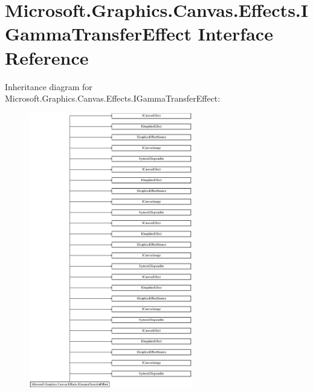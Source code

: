 \hypertarget{interface_microsoft_1_1_graphics_1_1_canvas_1_1_effects_1_1_i_gamma_transfer_effect}{}\section{Microsoft.\+Graphics.\+Canvas.\+Effects.\+I\+Gamma\+Transfer\+Effect Interface Reference}
\label{interface_microsoft_1_1_graphics_1_1_canvas_1_1_effects_1_1_i_gamma_transfer_effect}
Inheritance diagram for Microsoft.\+Graphics.\+Canvas.\+Effects.\+I\+Gamma\+Transfer\+Effect\+:\begin{figure}[H]
\begin{center}
\leavevmode
\includegraphics[height=12.000000cm]{interface_microsoft_1_1_graphics_1_1_canvas_1_1_effects_1_1_i_gamma_transfer_effect}
\end{center}
\end{figure}
